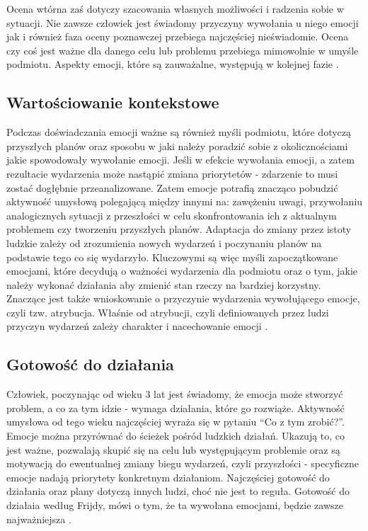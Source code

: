 Ocena wtórna zaś dotyczy szacowania własnych możliwości i radzenia sobie w sytuacji. Nie zawsze człowiek jest świadomy przyczyny wywołania u niego emocji jak i również faza oceny poznawczej przebiega najczęściej nieświadomie. Ocena czy coś jest ważne dla danego celu lub problemu przebiega mimowolnie w umyśle podmiotu. Aspekty emocji, które są zauważalne, występują w kolejnej fazie \citep{oatly, website:stres}.

\subsection{Wartościowanie kontekstowe}

Podczas doświadczania emocji ważne są również myśli podmiotu, które dotyczą przyszłych planów oraz sposobu w jaki należy poradzić sobie z okolicznościami jakie spowodowały wywołanie emocji. Jeśli w efekcie wywołania emocji, a zatem rezultacie wydarzenia może nastąpić zmiana priorytetów - zdarzenie to musi zostać dogłębnie przeanalizowane. Zatem emocje potrafią znacząco pobudzić aktywność umysłową polegającą między innymi na: zawężeniu uwagi, przywołaniu analogicznych sytuacji z przeszłości w celu skonfrontowania ich z aktualnym problemem czy tworzeniu przyszłych planów. Adaptacja do zmiany przez istoty ludzkie zależy od zrozumienia nowych wydarzeń i poczynaniu planów na podstawie tego co się wydarzyło. Kluczowymi są więc myśli zapoczątkowane emocjami, które decydują o ważności wydarzenia dla podmiotu oraz o tym, jakie należy wykonać działania aby zmienić stan rzeczy na bardziej korzystny. Znaczące jest także wnioskowanie o przyczynie wydarzenia wywołującego emocje, czyli tzw. atrybucja. Właśnie od atrybucji, czyli definiowanych przez ludzi przyczyn wydarzeń zależy charakter i nacechowanie emocji \citep{oatly}.

\subsection{Gotowość do działania}

Człowiek, poczynając od wieku 3 lat jest świadomy, że emocja może stworzyć problem, a co za tym idzie - wymaga działania, które go rozwiąże. Aktywność umysłowa od tego wieku najczęściej wyraża się w pytaniu ``Co z tym zrobić?''. Emocje można przyrównać do ścieżek pośród ludzkich działań. Ukazują to, co jest ważne, pozwalają skupić się na celu lub występującym problemie oraz są motywacją do ewentualnej zmiany biegu wydarzeń, czyli przyszłości - specyficzne emocje nadają priorytety konkretnym działaniom. Najczęściej gotowość do działania oraz plany dotyczą innych ludzi, choć nie jest to reguła. Gotowość do działaia według Frijdy, mówi o tym, że ta wywołana emocjami, będzie zawsze najważniejsza \citep{oatly, teorieemocji}.

